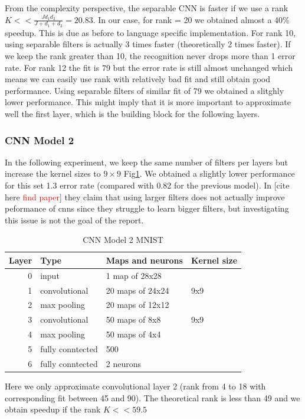 From the complexity perspective, the separable CNN is faster if we use a rank $K << \frac{Jd_{1}d_{2}}{J +d_{1}+d_{2}} = 20.83$. In our case, for rank = 20 we obtained almost a 40$\%$ speedup. This is due as before to language specific implementation.
For rank 10, using separable filters is actually 3 times faster (theoretically 2 times faster).
If we keep the rank greater than 10, the recognition never drops more than 1 error rate.
For rank 12 the fit is 79 but the error rate is still almost unchanged which means we can easily use rank with relatively bad fit and still obtain good performance. Using separable filters of similar fit of 79  we obtained a slitghly lower performance. This might imply that it is more important to approximate well the first layer, which is the building block for the following layers.
\subsubsection{CNN Model 2}
In the following experiment, we keep the same number of filters per layers but increase the
kernel sizes to $9\times9$ Fig\ref{fig:CNN2}. We obtained a slightly lower performance for this set 1.3 error rate (compared with 0.82 for the previous model). In [cite here \textcolor{red}{find paper}]
they claim that using larger filters does not actually improve peformance of cnns since they struggle to learn bigger filters, but investigating this issue is not the goal of the report.
\begin{table}[h!]
\centering
\begin{tabular}{@{}rlll@{}}\toprule
Layer & Type & Maps and neurons& Kernel size \\ \midrule
0 & input & 1 map of 28x28 &\\
1& convolutional & 20 maps of 24x24 & 9x9\\
2 & max pooling & 20 maps of 12x12 &  \\
3 & convolutional & 50 maps of 8x8& 9x9 \\
4 & max pooling & 50 maps of 4x4&  \\ 
5 & fully conntected& 500 & \\
6 & fully conntected & 2 neurons & \\ \bottomrule
\end{tabular}
\caption{CNN Model 2  MNIST}
\label{fig:CNN2}
\end{table}
Here we only approximate convolutional layer 2 (rank from 4 to 18 with corresponding fit between 45 and 90). The theoretical rank is less than 49 and we obtain speedup if the rank $K << 59.5$
